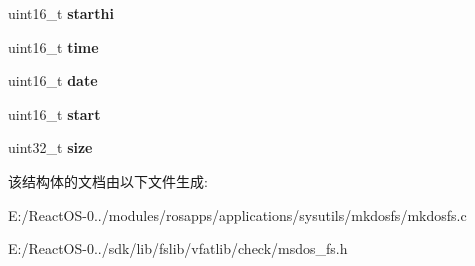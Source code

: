 \begin{DoxyCompactItemize}
\mbox{\label{structmsdos__dir__entry_a38b5295da4097ab0232498b3f7f07ee6}} 
uint16\+\_\+t {\bfseries starthi}
\item 
\mbox{\label{structmsdos__dir__entry_a7723acdbec98a3ba57cbffd901291551}} 
uint16\+\_\+t {\bfseries time}
\item 
\mbox{\label{structmsdos__dir__entry_a1e6a1fe68ac3b973ee6d37698ec3f75e}} 
uint16\+\_\+t {\bfseries date}
\item 
\mbox{\label{structmsdos__dir__entry_ae6a2315e7f84f5d3f975500146396f2c}} 
uint16\+\_\+t {\bfseries start}
\item 
\mbox{\label{structmsdos__dir__entry_a591369563a4bc7ed9dd80b3d4e2ae613}} 
uint32\+\_\+t {\bfseries size}
\end{DoxyCompactItemize}


该结构体的文档由以下文件生成\+:\begin{DoxyCompactItemize}
\item 
E\+:/\+React\+O\+S-\/0../modules/rosapps/applications/sysutils/mkdosfs/mkdosfs.\+c\item 
E\+:/\+React\+O\+S-\/0../sdk/lib/fslib/vfatlib/check/msdos\+\_\+fs.\+h\end{DoxyCompactItemize}
